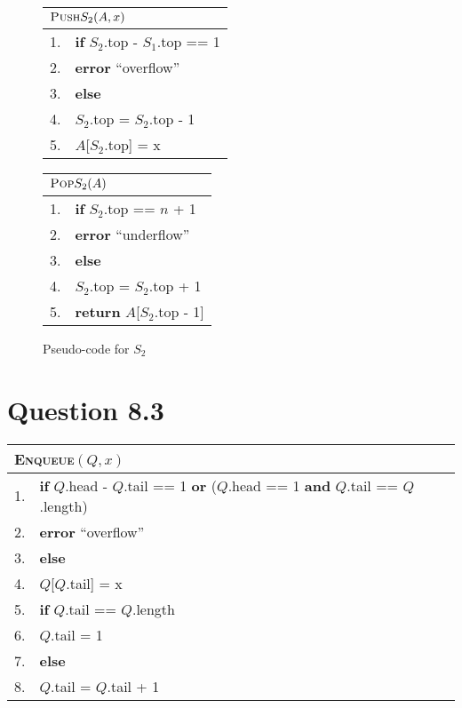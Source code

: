 \documentclass[a4paper,12pt]{article}
\begin{document}
\begin{figure}[H]
	\begin{minipage}{0.5\textwidth}
		\centering
		\begin{tabular}{ll}
			\toprule
			\multicolumn{2}{l}{$\textsc{Push}S_2(A,x)$} \\
			\midrule
			1. & \textbf{if} $S_2$.top - $S_1$.top == 1 \\
			2. & \quad \textbf{error} ``overflow'' \\
			3. & \textbf{else} \\
			4. & \quad $S_2$.top = $S_2$.top - 1 \\
			5. & \quad $A$[$S_2$.top] = x \\
			\bottomrule
		\end{tabular}
	\end{minipage}
	\begin{minipage}{0.5\textwidth}
		\centering
		\begin{tabular}{ll}
			\toprule
			\multicolumn{2}{l}{$\textsc{Pop}S_2(A)$} \\
			\midrule
			1. & \textbf{if} $S_2$.top == $n$ + 1 \\
			2. & \quad \textbf{error} ``underflow'' \\
			3. & \textbf{else} \\
			4. & \quad $S_2$.top = $S_2$.top + 1 \\
			5. & \quad \textbf{return} $A$[$S_2$.top - 1] \\
			\bottomrule
		\end{tabular}
	\end{minipage}
	\caption*{Pseudo-code for $S_2$}
\end{figure}

\section*{Question 8.3}

\begin{center}
	\begin{tabular}{ll}
		\toprule
		\multicolumn{2}{l}{\textsc{Enqueue}$(Q,x)$} \\
		\midrule
		1. & \textbf{if} $Q$.head - $Q$.tail == 1 \textbf{or} ($Q$.head == 1 \textbf{and} $Q$.tail == $Q$.length) \\
		2. & \quad \textbf{error} ``overflow'' \\
		3. & \textbf{else} \\
		4. & \quad $Q$[$Q$.tail] = x \\
		5. & \quad \textbf{if} $Q$.tail == $Q$.length \\
		6. & \quad \quad $Q$.tail = 1 \\
		7. & \quad \textbf{else} \\
		8. & \quad \quad $Q$.tail = $Q$.tail + 1 \\
		\bottomrule
	\end{tabular}
\end{center}
\end{document}
